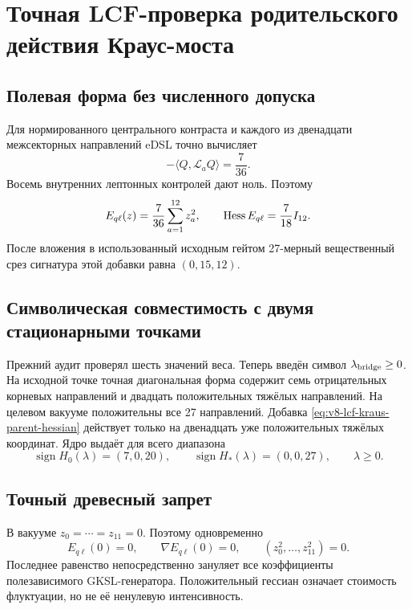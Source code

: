 \chapter{Точная LCF-проверка родительского действия Краус-моста}
\label{ch:v8-kraus-bridge-parent-action-lcf-migration-gate}

\section{Полевая форма без численного допуска}

Для нормированного центрального контраста и каждого из двенадцати
межсекторных направлений eDSL точно вычисляет
\begin{equation}
 -\langle Q,\mathcal L_aQ\rangle=\frac7{36}.
\end{equation}
Восемь внутренних лептонных контролей дают ноль. Поэтому
\begin{equation}
 E_{q\ell}(z)=\frac7{36}\sum_{a=1}^{12}z_a^2,
 \qquad
 \operatorname{Hess} E_{q\ell}=\frac7{18}I_{12}.
 \label{eq:v8-lcf-kraus-parent-hessian}
\end{equation}
После вложения в использованный исходным гейтом 27-мерный вещественный срез
сигнатура этой добавки равна $(0,15,12)$.

\section{Символическая совместимость с двумя стационарными точками}

Прежний аудит проверял шесть значений веса. Теперь введён символ
$\lambda_{\rm bridge}\ge0$. На исходной точке точная диагональная форма
содержит семь отрицательных корневых направлений и двадцать положительных
тяжёлых направлений. На целевом вакууме положительны все 27 направлений.
Добавка \eqref{eq:v8-lcf-kraus-parent-hessian} действует только на двенадцать
уже положительных тяжёлых координат. Ядро выдаёт для всего диапазона
\begin{equation}
 \operatorname{sign}H_0(\lambda)=(7,0,20),
 \qquad
 \operatorname{sign}H_*(\lambda)=(0,0,27),
 \qquad \lambda\ge0.
 \label{eq:v8-lcf-kraus-parent-signatures}
\end{equation}

\section{Точный древесный запрет}

В вакууме $z_0=\cdots=z_{11}=0$. Поэтому одновременно
\begin{equation}
 E_{q\ell}(0)=0,
 \qquad
 \nabla E_{q\ell}(0)=0,
 \qquad
 (z_0^2,\ldots,z_{11}^2)=0.
\end{equation}
Последнее равенство непосредственно зануляет все коэффициенты
полезависимого GKSL-генератора. Положительный гессиан означает стоимость
флуктуации, но не её ненулевую интенсивность.


